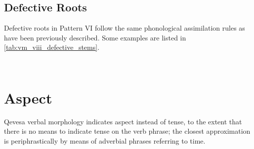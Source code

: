 \documentclass[grammar]{subfiles}
\begin{document}
\subsection{Defective Roots}
\label{ssec:vm_viii_defective_roots}

Defective roots in Pattern VI follow the same phonological assimilation rules
as have been previously described.  Some examples are listed in
\cref{tab:vm_viii_defective_stems}. 


\begin{table}[h!]\small\capstart
  \centering
  \\
  \caption{Pattern VIII defective stems \label{tab:vm_viii_defective_stems}}
\end{table}


\clearpage
\section{Aspect}
\label{sec:vm_aspect}

Qevesa verbal morphology indicates aspect instead of tense, to the extent that
there is no means to indicate tense on the verb phrase; the closest
approximation is periphrastically by means of adverbial phrases referring to
time. 
\end{document}

